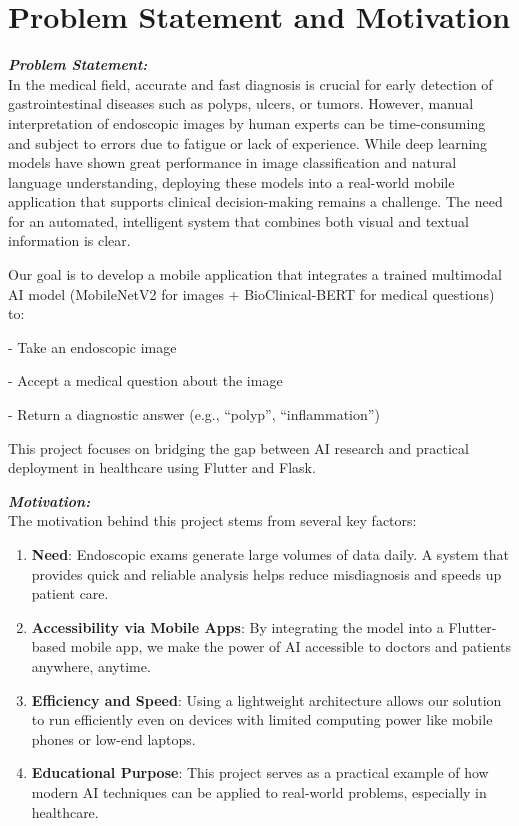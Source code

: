 \documentclass[12pt,a4paper]{report}
\begin{document}
\section{Problem Statement and Motivation}
\textbf{\textit{Problem Statement:}} \\
In the medical field, accurate and fast diagnosis is crucial for early detection of gastrointestinal diseases such as polyps, ulcers, or tumors. However, manual interpretation of endoscopic images by human experts can be time-consuming and subject to errors due to fatigue or lack of experience. While deep learning models have shown great performance in image classification and natural language understanding, deploying these models into a real-world mobile application that supports clinical decision-making remains a challenge. The need for an automated, intelligent system that combines both visual and textual information is clear.

Our goal is to develop a mobile application that integrates a trained multimodal AI model (MobileNetV2 for images + BioClinical-BERT for medical questions) to:

    
- Take an endoscopic image
    
- Accept a medical question about the image
    
- Return a diagnostic answer (e.g., ``polyp'', ``inflammation'')

This project focuses on bridging the gap between AI research and practical deployment in healthcare using Flutter and Flask.

\textbf{\textit{Motivation:}} \\
The motivation behind this project stems from several key factors:
\begin{enumerate}
    \item \textbf{Need}: Endoscopic exams generate large volumes of data daily. A system that provides quick and reliable analysis helps reduce misdiagnosis and speeds up patient care.
    \item \textbf{Accessibility via Mobile Apps}: By integrating the model into a Flutter-based mobile app, we make the power of AI accessible to doctors and patients anywhere, anytime.
    \item \textbf{Efficiency and Speed}: Using a lightweight architecture allows our solution to run efficiently even on devices with limited computing power like mobile phones or low-end laptops.
    \item \textbf{Educational Purpose}: This project serves as a practical example of how modern AI techniques can be applied to real-world problems, especially in healthcare.
\end{enumerate}
\end{document}
